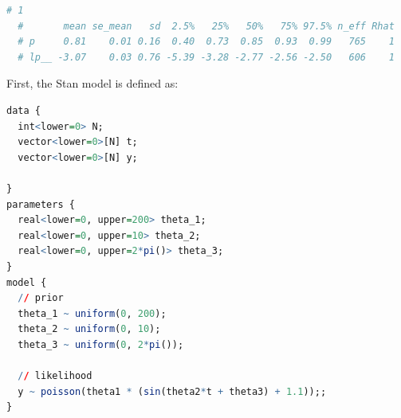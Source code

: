 \documentclass{article}
\begin{document}



\begin{lstlisting}[language=R]
  # 1
  #       mean se_mean   sd  2.5%   25%   50%   75% 97.5% n_eff Rhat
  # p     0.81    0.01 0.16  0.40  0.73  0.85  0.93  0.99   765    1
  # lp__ -3.07    0.03 0.76 -5.39 -3.28 -2.77 -2.56 -2.50   606    1
\end{lstlisting}


First, the Stan model is defined as:
\begin{lstlisting}[language=R]
data {
  int<lower=0> N;
  vector<lower=0>[N] t;
  vector<lower=0>[N] y;

}
parameters {
  real<lower=0, upper=200> theta_1;
  real<lower=0, upper=10> theta_2;
  real<lower=0, upper=2*pi()> theta_3;
}
model {
  // prior
  theta_1 ~ uniform(0, 200);
  theta_2 ~ uniform(0, 10);
  theta_3 ~ uniform(0, 2*pi());

  // likelihood
  y ~ poisson(theta1 * (sin(theta2*t + theta3) + 1.1));;
}
\end{lstlisting}
\end{document}
